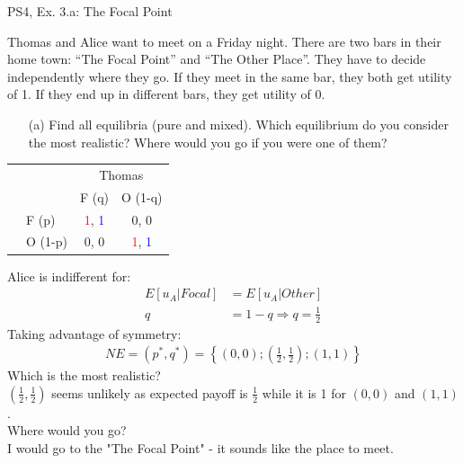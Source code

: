 \begin{frame}{PS4, Ex. 3.a: The Focal Point}
  \begin{multicols}{2}
    Thomas and Alice want to meet on a Friday night. There are two bars in their home town: “The Focal Point” and “The Other Place”. They have to decide independently where they go. If they meet in the same bar, they both get utility of 1. If they end up in different bars, they get utility of 0.
    \begin{itemize}
      \item[(a)] Find all equilibria (pure and mixed). Which equilibrium do you consider the most realistic? Where would you go if you were one of them?
    \end{itemize}
    \begin{table}
      \begin{tabular}{cl|c|c|}
        & \multicolumn{1}{c}{} & \multicolumn{2}{c}{\color{blue}Thomas}\\
        & \multicolumn{1}{c}{} & \multicolumn{1}{c}{F (q)} & \multicolumn{1}{c}{O (1-q)} \\\cline{3-4}
        \parbox[t]{1mm}{}
        & F (p) & \textcolor{red}{1}, \textcolor{blue}{1} & 0, 0 \\
        & O (1-p) & 0, 0 & \textcolor{red}{1}, \textcolor{blue}{1} \\
      \end{tabular}
    \end{table}
  \vfill\null \columnbreak
    Alice is indifferent for:
    \begin{align*}
      E[u_A|Focal]&=E[u_A|Other]\\
      q &= 1-q \Rightarrow q = \frac{1}{2}
    \end{align*}
    Taking advantage of symmetry:
    \begin{align*}
      NE=(p^{*},q^{*})=\left\{(0,0);\left(\frac{1}{2},\frac{1}{2}\right);(1,1)\right\}
    \end{align*}
    Which is the most realistic?\\\medskip
    $(\frac{1}{2},\frac{1}{2})$ seems unlikely as expected payoff is $\frac{1}{2}$ while it is 1 for $(0,0)$ and $(1,1)$.\\\medskip
    Where would you go?\\\medskip
    I would go to the "The Focal Point" - it sounds like the place to meet.
  \vfill\null
  \end{multicols}
\end{frame}
